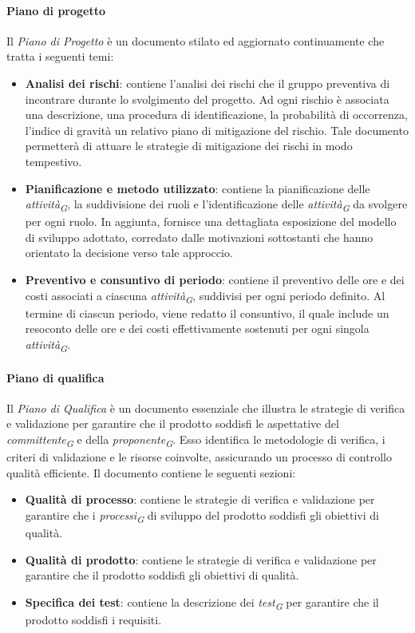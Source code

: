 \paragraph{Piano di progetto}
Il \textit{Piano di Progetto} è un documento stilato ed aggiornato continuamente che tratta i seguenti temi: 
\begin{itemize}
    \item \textbf{Analisi dei rischi}: contiene l'analisi dei rischi che il gruppo preventiva di incontrare durante lo svolgimento del progetto. Ad ogni rischio è associata una descrizione, una procedura di identificazione, la probabilità di occorrenza, l'indice di gravità un relativo piano di mitigazione del rischio. Tale documento permetterà di attuare le strategie di mitigazione dei rischi in modo tempestivo.  
    \item \textbf{Pianificazione e metodo utilizzato}: contiene la pianificazione delle \textit{attività}\textsubscript{\textit{G}}, la suddivisione dei ruoli e l'identificazione delle \textit{attività}\textsubscript{\textit{G}} da svolgere per ogni ruolo. In aggiunta, fornisce una dettagliata esposizione del modello di sviluppo adottato, corredato dalle motivazioni sottostanti che hanno orientato la decisione verso tale approccio.  
    \item \textbf{Preventivo e consuntivo di periodo}: contiene il preventivo  delle ore e dei costi associati a ciascuna \textit{attività}\textsubscript{\textit{G}}, suddivisi per ogni periodo definito. Al termine di ciascun periodo, viene redatto il consuntivo, il quale include un resoconto delle ore e dei costi effettivamente sostenuti per ogni singola \textit{attività}\textsubscript{\textit{G}}.  
\end{itemize}

\paragraph{Piano di qualifica}
Il \textit{Piano di Qualifica} è un documento essenziale che illustra le strategie di verifica e validazione per garantire che il prodotto soddisfi le aspettative del \textit{committente}\textsubscript{\textit{G}} e della \textit{proponente}\textsubscript{\textit{G}}. Esso identifica le metodologie di verifica, i criteri di validazione e le risorse coinvolte, assicurando un processo di controllo qualità efficiente.  
Il documento contiene le seguenti sezioni:  
\begin{itemize}
    \item \textbf{Qualità di processo}: contiene le strategie di verifica e validazione per garantire che i \textit{processi}\textsubscript{\textit{G}} di sviluppo del prodotto soddisfi gli obiettivi di qualità.
    \item \textbf{Qualità di prodotto}: contiene le strategie di verifica e validazione per garantire che il prodotto soddisfi gli obiettivi di qualità.
    \item \textbf{Specifica dei test}: contiene la descrizione dei \textit{test}\textsubscript{\textit{G}} per garantire che il prodotto soddisfi i requisiti.  
\end{itemize}


